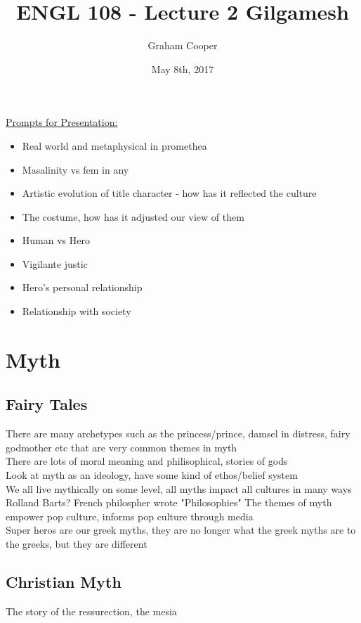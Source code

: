 \documentclass[12pt]{article}
\title{\vspace{-15ex}ENGL 108 - Lecture 2 Gilgamesh\vspace{-1ex}}
\date{May 8th, 2017}
\author{Graham Cooper}
\begin{document}
	\maketitle
	
	\underline{Prompts for Presentation:}\\
	\begin{itemize}
		\item Real world and metaphysical in promethea
		\item Masalinity vs fem in any
		\item Artistic evolution of title character - how has it reflected the culture
		\item The costume, how has it adjusted our view of them
		\item Human vs Hero
		\item Vigilante justic
		\item Hero's personal relationship
		\item Relationship with society
	\end{itemize}

	\section*{Myth}
	\subsection*{Fairy Tales}
	There are many archetypes such as the princess/prince, damsel in distress, fairy godmother etc that are very common themes in myth\\
	
	There are lots of moral meaning and philisophical, stories of gods\\
	
	Look at myth as an ideology, have some kind of ethos/belief system\\
	
	We all live mythically on some level, all myths impact all cultures in many ways\\

	Rolland Barts? French philospher wrote "Philosophies" The themes of myth empower pop culture, informs pop culture through media\\
	
	Super heros are our greek myths, they are no longer what the greek myths are to the greeks, but they are different\\
	
	\subsection*{Christian Myth}
	The story of the ressurection, the mesia\\
	
\end{document}
